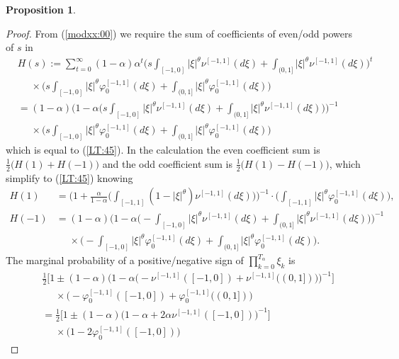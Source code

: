 \documentclass[preprint,11pt]{elsarticle}
\newtheorem{Proposition}{Proposition}
\theoremstyle{remark}
\def\spin{{[-1,1]}}
\begin{document}
{\begin{Proposition}
\end{Proposition}
\begin{proof}
From (\ref{modxx:00}) we require the sum of coefficients of even/odd powers of $s$ in
\begin{align*}
&H(s) := \sum_{t=0}^\infty(1-\alpha)\alpha^t
\Bigg (s\int_{[-1,0]}|\xi|^\theta\nu^\spin(d\xi)+ \int_{(0,1]}|\xi|^\theta\nu^\spin(d\xi)\Bigg )^t\nonumber\\
&~~~~~~\times\Bigg ({s}\int_{[-1,0]}|\xi|^\theta\varphi^\spin_0(d\xi)+ \int_{(0,1]}|\xi|^\theta\varphi^\spin_0(d\xi)\Bigg )\nonumber\\
&= (1-\alpha)\Bigg ( 
1 - \alpha \Big (s\int_{[-1,0]}|\xi|^\theta\nu^\spin(d\xi)  +\int_{(0,1]}|\xi|^\theta \nu^\spin(d\xi)\Big )\Bigg )^{-1}\nonumber\\
&~~~~~~\times\Bigg (s\int_{[-1,0]}|\xi|^\theta\varphi^\spin_0(d\xi)+ \int_{(0,1]}|\xi|^\theta\varphi^\spin_0(d\xi)\Bigg )
\end{align*}
 which is equal to (\ref{LT:45}). 
 In the calculation the even coefficient sum is $\frac{1}{2}\big (H(1)+H(-1)\big )$ and the odd coefficient sum is $\frac{1}{2}\big (H(1)-H(-1)\big )$, which simplify to (\ref{LT:45}) knowing
 \begin{align*}
H(1)&=\Bigg ( 
1 + \frac{\alpha}{1-\alpha} \Big (\int_{[-1,1]}(1-|\xi|^\theta)\nu^\spin(d\xi) \Big )\Bigg )^{-1}
\cdot\Bigg (\int_{[-1,1]}|\xi|^\theta\varphi^\spin_0(d\xi)\Bigg ),\\
H(-1) &= (1-\alpha)\Bigg ( 
1 - \alpha \Big (-\int_{[-1,0]}|\xi|^\theta\nu^\spin(d\xi)  +\int_{(0,1]}|\xi|^\theta \nu^\spin(d\xi)\Big )\Bigg )^{-1}\nonumber\\
&~~~~~~\times\Bigg (-\int_{[-1,0]}|\xi|^\theta\varphi^\spin_0(d\xi)+\int_{(0,1]}|\xi|^\theta\varphi^\spin_0(d\xi)\Bigg ).
\end{align*}
 The marginal probability of a positive/negative
sign of %
$\prod_{k=0}^{T_\alpha}\xi_k$
is 
\begin{align*}
& \frac{1}{2}\Bigg [ 1 \pm
(1-\alpha)\Bigg ( 
1 - \alpha \Big (-\nu^\spin([-1,0])  + \nu^\spin((0,1])\Big )\Bigg )^{-1}\Bigg ]\nonumber\\
&~~~~~~\times\Bigg (-\varphi^\spin_0([-1,0])+\varphi^\spin_0((0,1])\Bigg )\\
& =\frac{1}{2}\Bigg [ 1 \pm
(1-\alpha)\Bigg ( 
1 - \alpha  + 2\alpha\nu^\spin([-1,0])\Bigg )^{-1}\Bigg ]\\
&~~~~~~\times\Bigg (1 -2 \varphi^\spin_0([-1,0])\Bigg )
\end{align*}

\end{proof}}
\end{document}
